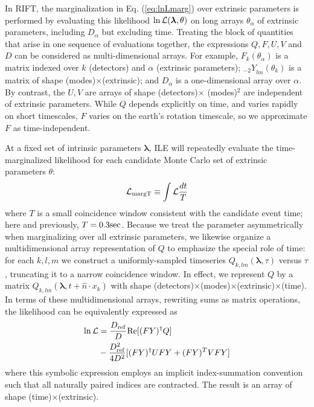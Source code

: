 \documentclass[twocolumn,prd,nofootinbib]{revtex4}
\newcommand\AddedResponse[1]{{\color{blue} {#1}}}
\newcommand\Y[1]{{{}_{#1}Y}}
\newcommand\unit[1]{{\rm #1}}
\newcommand\ILE{ILE}
\begin{document}
\AddedResponse{In RIFT, the marginalization in Eq. (\ref{eq:lnLmarg}) over extrinsic parameters is performed by evaluating this likelihood $\ln {\cal
    L}(\bm{\lambda},\theta)$ on long
  arrays $\theta_\alpha$ of extrinsic parameters, including $D_\alpha$ but excluding time.    Treating the block of quantities that arise
  in one sequence of evaluations together,  the expressions $Q,F,U,V$ and $D$ can be considered as multi-dimensional
  arrays.  For example, $F_k(\theta_\alpha)$ is a matrix indexed over $k$ (detectors) and $\alpha$
  (extrinsic parameters); $\Y{-2}_{lm}(\theta_k)$ is a matrix of shape (modes)$\times$(extrinsic); and $D_\alpha$ is a one-dimensional array over $\alpha$.  By contrast, the  $U,V$ are arrays of shape
  (detectors)$\times$ (modes)$^2$ are independent of extrinsic parameters.  While $Q$ depends explicitly on time, and
  varies rapidly on short timescales, $F$ varies on the earth's rotation timescale, so we  approximate $F$ as  time-independent. }


At a fixed set of intrinsic parameters $\bm{\lambda}$, \ILE{} will repeatedly evaluate the time-marginalized likelihood 
for each candidate Monte Carlo set of extrinsic parameters $\theta$:
\begin{eqnarray}
{\cal L}_{\rm margT} \equiv  \int {\cal L} \frac{dt}{T}
\label{eq:lnL:tmarg}
\end{eqnarray}
where $T$ is a small coincidence window consistent with the candidate event time; here and previously,
$T=0.3\unit{sec}$.  
%
\AddedResponse{
Because we treat the  parameter  asymmetrically when marginalizing over all extrinsic parameters, we likewise organize
a multidimensional array representation of $Q$ to emphasize the special role of time: for each $k,l,m$ we construct a uniformly-sampled timeseries
$Q_{k,lm}(\bm{\lambda},\tau)$ versus $\tau$, truncating it to a narrow coincidence window.   In effect, we represent $Q$
by a matrix 
  $Q_{k,lm}(\bm{\lambda},t+\hat{n}\cdot x_k)$ with  shape (detectors)$\times$(modes)$\times$(extrinsic)$\times$(time).
}
%
\AddedResponse{In terms of these multidimensional arrays, r}ewriting sums as matrix operations, the likelihood can be equivalently expressed as
\begin{align}
\ln {\cal L} &= \frac{D_{\rm ref}}{D} \text{Re}[ (F Y)^\dag Q]  \nonumber \\
 & - \frac{D_{\rm ref}^2}{4 D^2} [ (FY)^\dag U FY + (FY)^TV FY]
\label{eq:lnL:MatrixForm}
\end{align}
\AddedResponse{where this symbolic expression employs an implicit index-summation convention such that all naturally paired
  indices are contracted.  The result is an array of shape (time)$\times$(extrinsic).}
\end{document}
